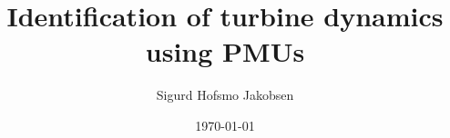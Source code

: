 \title{Identification of turbine dynamics using PMUs}
\author{Sigurd Hofsmo Jakobsen}
\date{\today}

\begin{frame}
  \titlepage
\end{frame}
